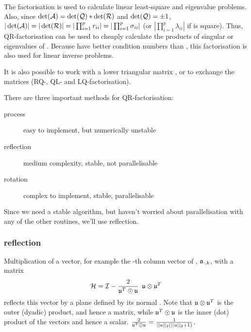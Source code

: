The factorisation is used to calculate linear least-square and eigenvalue problems. Also, since \(\det(\mathcal{A}) = \det(\mathcal{Q}) * \det(\mathcal{R}) \) and \(\det(\mathcal{Q}) = \pm 1 \), \(|\det(\mathcal{A})| = |\det(\mathcal{R})| = |\prod_{i=1}^p{r_{ii}}| = |\prod_{i=1}^p{\sigma_{ii}}| \) (or \(|\prod_{i=1}^p{\lambda_{ii}}| \) if  is square). Thus, QR-factorisation can be used to cheaply calculate the products of singular or eigenvalues of . Because  have better condition numbers than , this factorisation is also used for linear inverse problems.

It is also possible to work with a lower triangular matrix , or to exchange the matrices (RQ-, QL- and LQ-factorisation).

There are three important methods for QR-factorisation:
\begin{description}
  \item[ process]{easy to implement, but numerically unstable}
  \item[ reflection]{medium complexity, stable, not parallelisable}
  \item[ rotation]{complex to implement, stable, parallelisable}
\end{description}
Since we need a stable algorithm, but haven't worried about parallelisation with any of the other routines, we'll use  reflection.

\subsubsection{ reflection}

Multiplication of a vector, for example the -th column vector of , \(\mathfrak{a}_{\cdot,k} \), with a  matrix
\begin{equation}
  \mathcal{H} = \mathcal{I} - \frac{2}{\mathfrak{u}^T \odot \mathfrak{u}}\enspace \mathfrak{u} \otimes \mathfrak{u}^T
\end{equation}
reflects this vector by a plane defined by its normal . Note that \(\mathfrak{u} \otimes \mathfrak{u}^T \) is the outer (dyadic) product, and hence a matrix, while \(\mathfrak{u}^T \odot \mathfrak{u} \) is the inner (dot) product of the vectors and hence a scalar. \(\frac{2}{\mathfrak{u}^T \odot \mathfrak{u}} = \frac{1}{||u||_2 (||u||_2 +1)} \).

